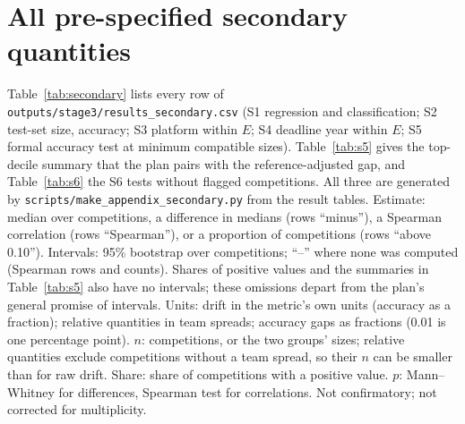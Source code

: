\section{All pre-specified secondary quantities}
\label{app:secondary}

{\raggedright
Table~\ref{tab:secondary} lists every row of \texttt{outputs/stage3/results\_secondary.csv} (S1 regression and classification; S2 test-set size, accuracy; S3 platform within $E$; S4 deadline year within $E$; S5 formal accuracy test at minimum compatible sizes). Table~\ref{tab:s5} gives the top-decile summary that the plan pairs with the reference-adjusted gap, and Table~\ref{tab:s6} the S6 tests without flagged competitions. All three are generated by \texttt{scripts/make\_appendix\_secondary.py} from the result tables. Estimate: median over competitions, a difference in medians (rows ``minus''), a Spearman correlation (rows ``Spearman''), or a proportion of competitions (rows ``above 0.10''). Intervals: 95\% bootstrap over competitions; ``--'' where none was computed (Spearman rows and counts). Shares of positive values and the summaries in Table~\ref{tab:s5} also have no intervals; these omissions depart from the plan's general promise of intervals. Units: drift in the metric's own units (accuracy as a fraction); relative quantities in team spreads; accuracy gaps as fractions (0.01 is one percentage point). $n$: competitions, or the two groups' sizes; relative quantities exclude competitions without a team spread, so their $n$ can be smaller than for raw drift. Share: share of competitions with a positive value. $p$: Mann--Whitney for differences, Spearman test for correlations. Not confirmatory; not corrected for multiplicity.\par}

